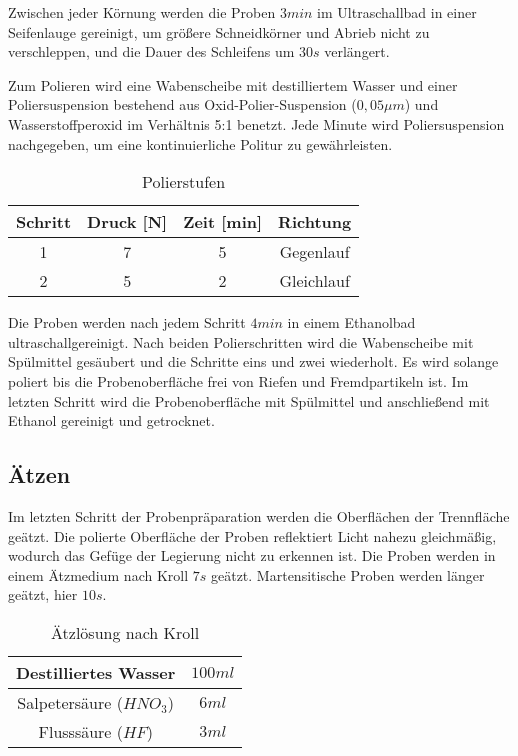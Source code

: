 Zwischen jeder Körnung werden die Proben $3 min$ im Ultraschallbad in einer Seifenlauge gereinigt, um größere Schneidkörner und Abrieb nicht zu verschleppen, und die Dauer des Schleifens um $30 s$ verlängert. 

Zum Polieren wird eine Wabenscheibe mit destilliertem Wasser und einer Poliersuspension bestehend aus Oxid-Polier-Suspension ($0,05 \mu m$) und Wasserstoffperoxid im Verhältnis 5:1 benetzt. Jede Minute wird Poliersuspension nachgegeben, um eine kontinuierliche Politur zu gewährleisten.

\begin{table}[h]
	\centering
	
	\begin{tabular}{|c|c|c|c|}
		\hline 
		Schritt & Druck [N] & Zeit [min] & Richtung \\ 
		\hline 
		1 & 7 & 5 & Gegenlauf \\ 
		\hline 
		2 & 5 & 2 & Gleichlauf \\ 
		\hline 
	\end{tabular} 
	\caption{Polierstufen}
	\label{tab:Polierstufen}
\end{table}

Die Proben werden nach jedem Schritt $4 min$ in einem Ethanolbad ultraschallgereinigt. Nach beiden Polierschritten wird die Wabenscheibe mit Spülmittel gesäubert und die Schritte eins und zwei wiederholt. Es wird solange poliert bis die Probenoberfläche frei von Riefen und Fremdpartikeln ist. Im letzten Schritt wird die Probenoberfläche mit Spülmittel und anschließend mit Ethanol gereinigt und getrocknet. 


\subsection{Ätzen}

Im letzten Schritt der Probenpräparation werden die Oberflächen der Trennfläche geätzt. Die polierte Oberfläche der Proben reflektiert Licht nahezu gleichmäßig, wodurch das Gefüge der Legierung nicht zu erkennen ist. 
Die Proben werden in einem Ätzmedium nach Kroll $7s$ geätzt. Martensitische Proben werden länger geätzt, hier $10s$. 

\begin{table}[h]
	\centering
	\begin{tabular}{|c|c|}
		
		\hline 
		Destilliertes Wasser
		& $100ml$
		\\ 
		\hline 
		Salpetersäure ($HNO_{3}$)	& $6ml$
		\\ 
		\hline 
		Flusssäure ($HF$) & $3ml$
		\\ 
		\hline 
	\end{tabular} 
	\caption{Ätzlösung nach Kroll}
	\label{tab:Ätz_Kroll}
\end{table}



